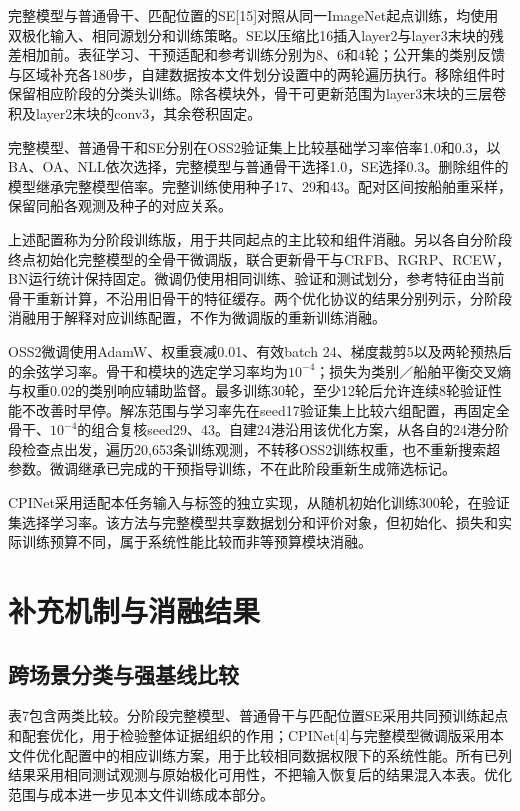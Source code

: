 \documentclass[journal,10pt,a4paper]{IEEEtran}
\begin{document}
完整模型与普通骨干、匹配位置的SE{[}15{]}对照从同一ImageNet起点训练，均使用双极化输入、相同源划分和训练策略。SE以压缩比16插入layer2与layer3末块的残差相加前。表征学习、干预适配和参考训练分别为8、6和4轮；公开集的类别反馈与区域补充各180步，自建数据按本文件划分设置中的两轮遍历执行。移除组件时保留相应阶段的分类头训练。除各模块外，骨干可更新范围为layer3末块的三层卷积及layer2末块的conv3，其余卷积固定。

完整模型、普通骨干和SE分别在OSS2验证集上比较基础学习率倍率1.0和0.3，以BA、OA、NLL依次选择，完整模型与普通骨干选择1.0，SE选择0.3。删除组件的模型继承完整模型倍率。完整训练使用种子17、29和43。配对区间按船舶重采样，保留同船各观测及种子的对应关系。

上述配置称为分阶段训练版，用于共同起点的主比较和组件消融。另以各自分阶段终点初始化完整模型的全骨干微调版，联合更新骨干与CRFB、RGRP、RCEW，BN运行统计保持固定。微调仍使用相同训练、验证和测试划分，参考特征由当前骨干重新计算，不沿用旧骨干的特征缓存。两个优化协议的结果分别列示，分阶段消融用于解释对应训练配置，不作为微调版的重新训练消融。

OSS2微调使用AdamW、权重衰减0.01、有效batch 24、梯度裁剪5以及两轮预热后的余弦学习率。骨干和模块的选定学习率均为\(10^{-4}\)；损失为类别／船舶平衡交叉熵与权重0.02的类别响应辅助监督。最多训练30轮，至少12轮后允许连续8轮验证性能不改善时早停。解冻范围与学习率先在seed17验证集上比较六组配置，再固定全骨干、\(10^{-4}\)的组合复核seed29、43。自建24港沿用该优化方案，从各自的24港分阶段检查点出发，遍历20,653条训练观测，不转移OSS2训练权重，也不重新搜索超参数。微调继承已完成的干预指导训练，不在此阶段重新生成筛选标记。

CPINet采用适配本任务输入与标签的独立实现，从随机初始化训练300轮，在验证集选择学习率。该方法与完整模型共享数据划分和评价对象，但初始化、损失和实际训练预算不同，属于系统性能比较而非等预算模块消融。

\FloatBarrier

\section{补充机制与消融结果}\label{ux8865ux5145ux673aux5236ux4e0eux6d88ux878dux7ed3ux679c}

\subsection{跨场景分类与强基线比较}\label{ux8de8ux573aux666fux5206ux7c7bux4e0eux5f3aux57faux7ebfux6bd4ux8f83}

表7包含两类比较。分阶段完整模型、普通骨干与匹配位置SE采用共同预训练起点和配套优化，用于检验整体证据组织的作用；CPINet{[}4{]}与完整模型微调版采用本文件优化配置中的相应训练方案，用于比较相同数据权限下的系统性能。所有已列结果采用相同测试观测与原始极化可用性，不把输入恢复后的结果混入本表。优化范围与成本进一步见本文件训练成本部分。
\end{document}
